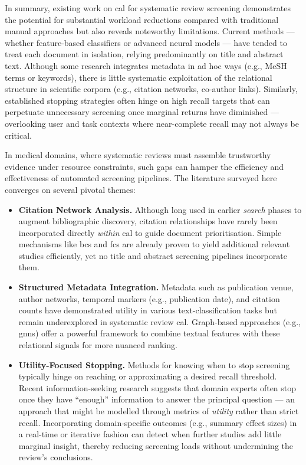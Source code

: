 \documentclass[10pt,oneside]{book}
\begin{document}
In summary, existing work on \gls*{cal} for systematic review screening demonstrates the potential for substantial workload reductions compared with traditional manual approaches but also reveals noteworthy limitations. Current methods — whether feature-based classifiers or advanced neural models — have tended to treat each document in isolation, relying predominantly on title and abstract text. Although some research integrates metadata in ad hoc ways (e.g., MeSH terms or keywords), there is little systematic exploitation of the relational structure in scientific corpora (e.g., citation networks, co-author links). Similarly, established stopping strategies often hinge on high recall targets that can perpetuate unnecessary screening once marginal returns have diminished — overlooking user and task contexts where near-complete recall may not always be critical.

In medical domains, where systematic reviews must assemble trustworthy evidence under resource constraints, such gaps can hamper the efficiency and effectiveness of automated screening pipelines. The literature surveyed here converges on several pivotal themes:

\begin{itemize} \item \textbf{Citation Network Analysis.} Although long used in earlier \emph{search} phases to augment bibliographic discovery, citation relationships have rarely been incorporated directly \emph{within} \gls*{cal} to guide document prioritisation. Simple mechanisms like \gls*{bcs} and \gls*{fcs} are already proven to yield additional relevant studies efficiently, yet no title and abstract screening pipelines incorporate them.

\item \textbf{Structured Metadata Integration.} Metadata such as publication venue, author networks, temporal markers (e.g., publication date), and citation counts have demonstrated utility in various text-classification tasks but remain underexplored in systematic review \gls*{cal}. Graph-based approaches (e.g., \glspl*{gnn}) offer a powerful framework to combine textual features with these relational signals for more nuanced ranking.

\item \textbf{Utility-Focused Stopping.} Methods for knowing when to stop screening typically hinge on reaching or approximating a desired recall threshold. Recent information-seeking research suggests that domain experts often stop once they have ``enough'' information to answer the principal question — an approach that might be modelled through metrics of \emph{utility} rather than strict recall. Incorporating domain-specific outcomes (e.g., summary effect sizes) in a real-time or iterative fashion can detect when further studies add little marginal insight, thereby reducing screening loads without undermining the review’s conclusions.

\end{itemize}
\end{document}
